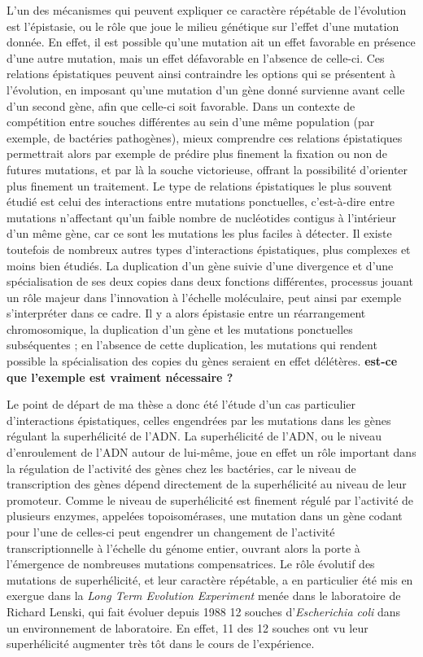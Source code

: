 L'un des mécanismes qui peuvent expliquer ce caractère répétable de l'évolution est l'épistasie, ou le rôle que joue le milieu génétique sur l'effet d'une mutation donnée.
En effet, il est possible qu'une mutation ait un effet favorable en présence d'une autre mutation, mais un effet défavorable en l'absence de celle-ci.
Ces relations épistatiques peuvent ainsi contraindre les options qui se présentent à l'évolution, en imposant qu'une mutation d'un gène donné survienne avant celle d'un second gène, afin que celle-ci soit favorable.
Dans un contexte de compétition entre souches différentes au sein d'une même population (par exemple, de bactéries pathogènes), mieux comprendre ces relations épistatiques permettrait alors par exemple de prédire plus finement la fixation ou non de futures mutations, et par là la souche victorieuse, offrant la possibilité d'orienter plus finement un traitement.
Le type de relations épistatiques le plus souvent étudié est celui des interactions entre mutations ponctuelles, c'est-à-dire entre mutations n'affectant qu'un faible nombre de nucléotides contigus à l'intérieur d'un même gène, car ce sont les mutations les plus faciles à détecter.
Il existe toutefois de nombreux autres types d'interactions épistatiques, plus complexes et moins bien étudiés.
La duplication d'un gène suivie d'une divergence et d'une spécialisation de ses deux copies dans deux fonctions différentes, processus jouant un rôle majeur dans l'innovation à l'échelle moléculaire, peut ainsi par exemple s'interpréter dans ce cadre.
Il y a alors épistasie entre un réarrangement chromosomique, la duplication d'un gène et les mutations ponctuelles subséquentes ; en l'absence de cette duplication, les mutations qui rendent possible la spécialisation des copies du gènes seraient en effet délétères. \textbf{est-ce que l'exemple est vraiment nécessaire ?}

Le point de départ de ma thèse a donc été l'étude d'un cas particulier d'interactions épistatiques, celles engendrées par les mutations dans les gènes régulant la superhélicité de l'ADN.
La superhélicité de l'ADN, ou le niveau d'enroulement de l'ADN autour de lui-même, joue en effet un rôle important dans la régulation de l'activité des gènes chez les bactéries, car le niveau de transcription des gènes dépend directement de la superhélicité au niveau de leur promoteur.
Comme le niveau de superhélicité est finement régulé par l'activité de plusieurs enzymes, appelées topoisomérases, une mutation dans un gène codant pour l'une de celles-ci peut engendrer un changement de l'activité transcriptionnelle à l'échelle du génome entier,
ouvrant alors la porte à l'émergence de nombreuses mutations compensatrices.
Le rôle évolutif des mutations de superhélicité, et leur caractère répétable, a en particulier été mis en exergue dans la \emph{Long Term Evolution Experiment} menée dans le laboratoire de Richard Lenski, qui fait évoluer depuis 1988 12 souches d'\emph{Escherichia coli} dans un environnement de laboratoire.
En effet, 11 des 12 souches ont vu leur superhélicité augmenter très tôt dans le cours de l'expérience.

